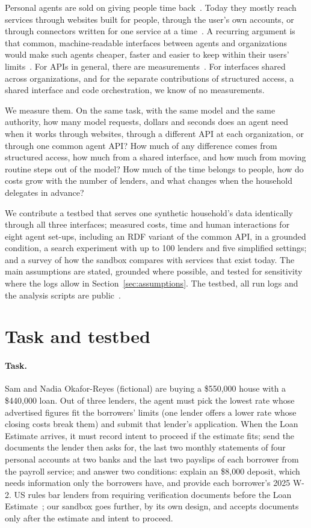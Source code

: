 \documentclass[11pt]{article}
\begin{document}
Personal agents are sold on giving people time back~\cite{muse,dots}. Today they mostly reach services through websites built for people, through the user's own accounts, or through connectors written for one service at a time~\cite{musesafety,dotssafety,plaid}. A recurring argument is that common, machine-readable interfaces between agents and organizations would make such agents cheaper, faster and easier to keep within their users' limits~\cite{cupa,agenticweb}. For APIs in general, there are measurements~\cite{beyondbrowsing}. For interfaces shared across organizations, and for the separate contributions of structured access, a shared interface and code orchestration, we know of no measurements.

We measure them. On the same task, with the same model and the same authority, how many model requests, dollars and seconds does an agent need when it works through websites, through a different API at each organization, or through one common agent API? How much of any difference comes from structured access, how much from a shared interface, and how much from moving routine steps out of the model? How much of the time belongs to people, how do costs grow with the number of lenders, and what changes when the household delegates in advance?

We contribute a testbed that serves one synthetic household's data identically through all three interfaces; measured costs, time and human interactions for eight agent set-ups, including an RDF variant of the common API, in a grounded condition, a search experiment with up to 100 lenders and five simplified settings; and a survey of how the sandbox compares with services that exist today. The main assumptions are stated, grounded where possible, and tested for sensitivity where the logs allow in Section~\ref{sec:assumptions}. The testbed, all run logs and the analysis scripts are public~\cite{artifact}.

\section{Task and testbed}

\paragraph{Task.} Sam and Nadia Okafor-Reyes (fictional) are buying a \$550{,}000 house with a \$440{,}000 loan. Out of three lenders, the agent must pick the lowest rate whose advertised figures fit the borrowers' limits (one lender offers a lower rate whose closing costs break them) and submit that lender's application. When the Loan Estimate arrives, it must record intent to proceed if the estimate fits; send the documents the lender then asks for, the last two monthly statements of four personal accounts at two banks and the last two payslips of each borrower from the payroll service; and answer two conditions: explain an \$8{,}000 deposit, which needs information only the borrowers have, and provide each borrower's 2025 W-2. US rules bar lenders from requiring verification documents before the Loan Estimate~\cite{ecfr1026}; our sandbox goes further, by its own design, and accepts documents only after the estimate and intent to proceed.
\end{document}

